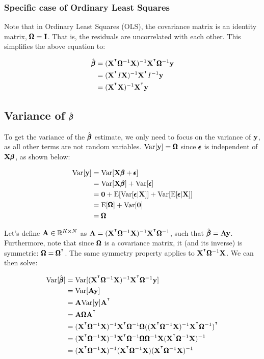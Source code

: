\documentclass[12pt]{article}
\begin{document}
\subsubsection{Specific case of Ordinary Least Squares}

Note that in Ordinary Least Squares (OLS), the covariance matrix is an identity matrix, $\pmb{\Omega} = \mathbf{I}$. That is, the residuals are uncorrelated with each other. This simplifies the above equation to:

\begin{align*}
    \hat{\pmb{\beta}} &= (\mathbf{X}^{^\intercal} \pmb{\Omega}^{-1} \mathbf{X})^{-1} \mathbf{X}^{^\intercal} \pmb{\Omega}^{-1} \mathbf{y} \\
    &= (\mathbf{X}^{^\intercal} I \mathbf{X})^{-1} \mathbf{X}^{^\intercal} I^{-1} \mathbf{y} \\
    &= (\mathbf{X}^{^\intercal} \mathbf{X})^{-1} \mathbf{X}^{^\intercal} \mathbf{y}
\end{align*}



\subsection[Variance of beta-hat]{Variance of $\hat{\pmb{\beta}}$}

To get the variance of the $\hat{\pmb{\beta}}$ estimate, we only need to focus on the variance of $\mathbf{y}$, as all other terms are not random variables. $\mathrm{Var}[\mathbf{y}] = \pmb{\Omega}$ since $\pmb{\epsilon}$ is independent of $\mathbf{X} \pmb{\beta}$, as shown below:

\begin{align*}
    \mathrm{Var}[\mathbf{y}] &= \mathrm{Var}[\mathbf{X} \pmb{\beta} + \pmb{\epsilon}] \\
    &= \mathrm{Var}[\mathbf{X} \pmb{\beta}] + \mathrm{Var}[\pmb{\epsilon}] \\
    &= \textbf{0} + \mathrm{E}[ \mathrm{Var}[\pmb{\epsilon} | \mathbf{X}] ] + \mathrm{Var}[ \mathrm{E}[\pmb{\epsilon} | \mathbf{X}]] \\
    &= \mathrm{E}[ \pmb{\Omega} ] + \mathrm{Var}[ \textbf{0} ] \\ 
    &= \pmb{\Omega}
\end{align*}

Let's define $\mathbf{A} \in \mathbb{R}^{K \times N}$ as $\mathbf{A} = (\mathbf{X}^{^\intercal} \pmb{\Omega}^{-1} \mathbf{X})^{-1} \mathbf{X}^{^\intercal} \pmb{\Omega}^{-1}$, such that $\hat{\pmb{\beta}} = \mathbf{A} \mathbf{y}$. Furthermore, note that since $\pmb{\Omega}$ is a covariance matrix, it (and its inverse) is symmetric: $\pmb{\Omega} = \pmb{\Omega}^{^\intercal}$. The same symmetry property applies to $\mathbf{X}^{^\intercal} \pmb{\Omega}^{-1} \mathbf{X}$. We can then solve:

\begin{align*}
    \mathrm{Var}[ \hat{\pmb{\beta}} ] &= \mathrm{Var}[(\mathbf{X}^{^\intercal} \pmb{\Omega}^{-1} \mathbf{X})^{-1} \mathbf{X}^{^\intercal} \pmb{\Omega}^{-1} \mathbf{y}] \\
    &= \mathrm{Var}[\mathbf{A} \mathbf{y}] \\
    &= \mathbf{A} \mathrm{Var}[\mathbf{y}] \mathbf{A}^{^\intercal} \\
    &= \mathbf{A} \pmb{\Omega} \mathbf{A}^{^\intercal} \\
    &= (\mathbf{X}^{^\intercal} \pmb{\Omega}^{-1} \mathbf{X})^{-1} \mathbf{X}^{^\intercal} \pmb{\Omega}^{-1} \pmb{\Omega} ((\mathbf{X}^{^\intercal} \pmb{\Omega}^{-1} \mathbf{X})^{-1} \mathbf{X}^{^\intercal} \pmb{\Omega}^{-1})^{^\intercal} \\
    &= (\mathbf{X}^{^\intercal} \pmb{\Omega}^{-1} \mathbf{X})^{-1} \mathbf{X}^{^\intercal} \pmb{\Omega}^{-1} \pmb{\Omega} \pmb{\Omega}^{-1} \mathbf{X} (\mathbf{X}^{^\intercal} \pmb{\Omega}^{-1} \mathbf{X})^{-1} \\
    &= (\mathbf{X}^{^\intercal} \pmb{\Omega}^{-1} \mathbf{X})^{-1} (\mathbf{X}^{^\intercal} \pmb{\Omega}^{-1} \mathbf{X}) (\mathbf{X}^{^\intercal} \pmb{\Omega}^{-1} \mathbf{X})^{-1}
\end{align*}
\end{document}
